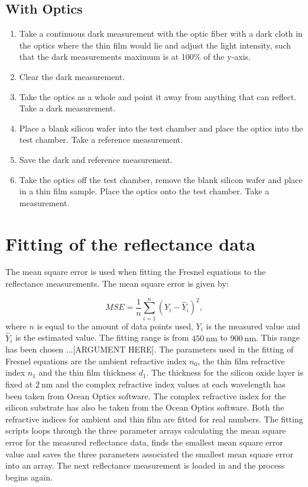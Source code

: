 \documentclass[MasterThesisMain.tex]{subfiles}
\begin{document}
\subsection{With Optics}
\begin{enumerate}
\item Take a continuous dark measurement with the optic fiber with a dark cloth in the optics where the thin film would lie and adjust the light intensity, such that the dark measurements maximum is at 100$\%$ of the y-axis.
\item Clear the dark measurement.
\item Take the optics as a whole and point it away from anything that can reflect. Take a dark measurement.
\item Place a blank silicon wafer into the test chamber and place the optics into the test chamber. Take a reference measurement.
\item Save the dark and reference measurement.
\item Take the optics off the test chamber, remove the blank silicon wafer and place in a thin film sample. Place the optics onto the test chamber. Take a measurement.
\end{enumerate}

\section{Fitting of the reflectance data} \label{sec:fitting}
The mean square error is used when fitting the Fresnel equations to the reflectance measurements. The mean square error is given by:

\begin{equation}
MSE = \frac{1}{n}\sum_{i=1}^{n}\left( Y_i - \hat{Y}_i \right)^2,
\end{equation} 
where $n$ is equal to the amount of data points used, $Y_i$ is the measured value and $\hat{Y}_i$ is the estimated value. The fitting range is from $\SI{450}{\nano\meter}$ to $\SI{900}{\nano\meter}$. This range has been chosen ...[ARGUMENT HERE]. The parameters used in the fitting of Fresnel equations are the ambient refractive index $n_0$, the thin film refractive index $n_1$ and the thin film thickness $d_1$. The thickness for the silicon oxide layer is fixed at $\SI{2}{\nano\meter}$ and the complex refractive index values at each wavelength has been taken from Ocean Optics software. The complex refractive index for the silicon substrate has also be taken from the Ocean Optics software. Both the refractive indices for ambient and thin film are fitted for real numbers. The fitting scripts loops through the three parameter arrays calculating the mean square error for the measured reflectance data, finds the smallest mean square error value and saves the three parameters associated the smallest mean square error into an array. The next reflectance measurement is loaded in and the process begins again.
\end{document}
